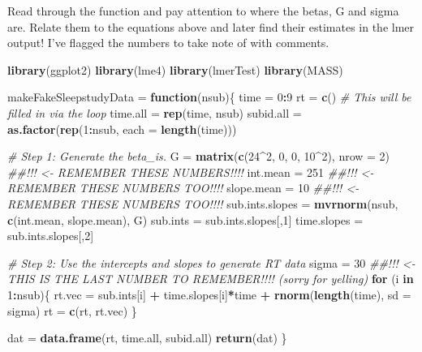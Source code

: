 \documentclass[
]{book}
\newenvironment{Shaded}{\begin{snugshade}}{\end{snugshade}}
\newcommand{\CommentTok}[1]{\textcolor[rgb]{0.56,0.35,0.01}{\textit{#1}}}
\newcommand{\ControlFlowTok}[1]{\textcolor[rgb]{0.13,0.29,0.53}{\textbf{#1}}}
\newcommand{\DataTypeTok}[1]{\textcolor[rgb]{0.13,0.29,0.53}{#1}}
\newcommand{\DecValTok}[1]{\textcolor[rgb]{0.00,0.00,0.81}{#1}}
\newcommand{\KeywordTok}[1]{\textcolor[rgb]{0.13,0.29,0.53}{\textbf{#1}}}
\newcommand{\NormalTok}[1]{#1}
\newcommand{\OperatorTok}[1]{\textcolor[rgb]{0.81,0.36,0.00}{\textbf{#1}}}
\newcommand{\StringTok}[1]{\textcolor[rgb]{0.31,0.60,0.02}{#1}}
\begin{document}
Read through the function and pay attention to where the betas, G and sigma are. Relate them to the equations above and later find their estimates in the lmer output! I've flagged the numbers to take note of with comments.

\begin{Shaded}
\begin{Highlighting}[]
\KeywordTok{library}\NormalTok{(ggplot2)}
\KeywordTok{library}\NormalTok{(lme4)}
\KeywordTok{library}\NormalTok{(lmerTest)}
\KeywordTok{library}\NormalTok{(MASS)}

\NormalTok{makeFakeSleepstudyData =}\StringTok{ }\ControlFlowTok{function}\NormalTok{(nsub)\{}
\NormalTok{  time =}\StringTok{ }\DecValTok{0}\OperatorTok{:}\DecValTok{9}
\NormalTok{  rt =}\StringTok{ }\KeywordTok{c}\NormalTok{() }\CommentTok{\# This will be filled in via the loop}
\NormalTok{  time.all =}\StringTok{ }\KeywordTok{rep}\NormalTok{(time, nsub)}
\NormalTok{  subid.all =}\StringTok{ }\KeywordTok{as.factor}\NormalTok{(}\KeywordTok{rep}\NormalTok{(}\DecValTok{1}\OperatorTok{:}\NormalTok{nsub, }\DataTypeTok{each =} \KeywordTok{length}\NormalTok{(time)))}
  
  \CommentTok{\# Step 1:  Generate the beta\_i\textquotesingle{}s.  }
\NormalTok{  G =}\StringTok{ }\KeywordTok{matrix}\NormalTok{(}\KeywordTok{c}\NormalTok{(}\DecValTok{24}\OperatorTok{\^{}}\DecValTok{2}\NormalTok{, }\DecValTok{0}\NormalTok{, }\DecValTok{0}\NormalTok{, }\DecValTok{10}\OperatorTok{\^{}}\DecValTok{2}\NormalTok{), }\DataTypeTok{nrow =} \DecValTok{2}\NormalTok{)   }\CommentTok{\#\#!!! <{-} REMEMBER THESE NUMBERS!!!!}
\NormalTok{  int.mean =}\StringTok{ }\DecValTok{251}  \CommentTok{\#\#!!! <{-} REMEMBER THESE NUMBERS TOO!!!!}
\NormalTok{  slope.mean =}\StringTok{ }\DecValTok{10}  \CommentTok{\#\#!!! <{-} REMEMBER THESE NUMBERS TOO!!!!}
\NormalTok{  sub.ints.slopes =}\StringTok{ }\KeywordTok{mvrnorm}\NormalTok{(nsub, }\KeywordTok{c}\NormalTok{(int.mean, slope.mean), G)}
\NormalTok{  sub.ints =}\StringTok{ }\NormalTok{sub.ints.slopes[,}\DecValTok{1}\NormalTok{]}
\NormalTok{  time.slopes =}\StringTok{ }\NormalTok{sub.ints.slopes[,}\DecValTok{2}\NormalTok{]}
  
  \CommentTok{\# Step 2:  Use the intercepts and slopes to generate RT data}
\NormalTok{  sigma =}\StringTok{ }\DecValTok{30}      \CommentTok{\#\#!!! <{-} THIS IS THE LAST NUMBER TO REMEMBER!!!! (sorry for yelling)}
  \ControlFlowTok{for}\NormalTok{ (i }\ControlFlowTok{in} \DecValTok{1}\OperatorTok{:}\NormalTok{nsub)\{}
\NormalTok{    rt.vec =}\StringTok{ }\NormalTok{sub.ints[i] }\OperatorTok{+}\StringTok{ }\NormalTok{time.slopes[i]}\OperatorTok{*}\NormalTok{time }\OperatorTok{+}\StringTok{ }\KeywordTok{rnorm}\NormalTok{(}\KeywordTok{length}\NormalTok{(time), }\DataTypeTok{sd =}\NormalTok{ sigma)}
\NormalTok{    rt =}\StringTok{ }\KeywordTok{c}\NormalTok{(rt, rt.vec)}
\NormalTok{  \}}
  
\NormalTok{  dat =}\StringTok{ }\KeywordTok{data.frame}\NormalTok{(rt, time.all, subid.all)}
  \KeywordTok{return}\NormalTok{(dat)}
\NormalTok{\}}
\end{Highlighting}
\end{Shaded}
\end{document}
